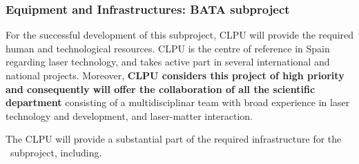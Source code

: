 \subsubsection*{Equipment and Infrastructures: BATA subproject}

For the successful development of this subproject, CLPU will provide the required human and technological resources. CLPU is the centre of reference in Spain regarding laser technology, and takes active part in several international and national projects.  Moreover, {\bf CLPU considers this project of high priority and consequently will offer the collaboration of all the scientific department} consisting of a multidisciplinar team with broad experience in laser technology and development, and laser-matter interaction. 

The CLPU will provide a substantial part of the required infrastructure for the \BATA\ subproject, including.
 
